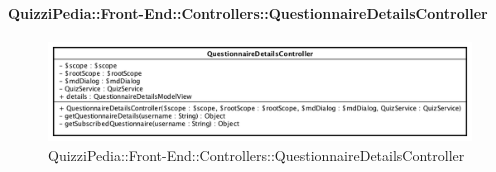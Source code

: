 \paragraph[QuizziPedia::Front-End::Controllers\\::QuestionnaireDetailsController]{QuizziPedia::Front-End::Controllers::QuestionnaireDetailsController}
\begin{figure} [ht]
	\centering
	\includegraphics[scale=0.5]{UML/Classi/Front-End/QuizziPedia_Front-end_Controller_QuestionnaireDetailsController.png}
	\caption{QuizziPedia::Front-End::Controllers::QuestionnaireDetailsController}
\end{figure} \FloatBarrier

